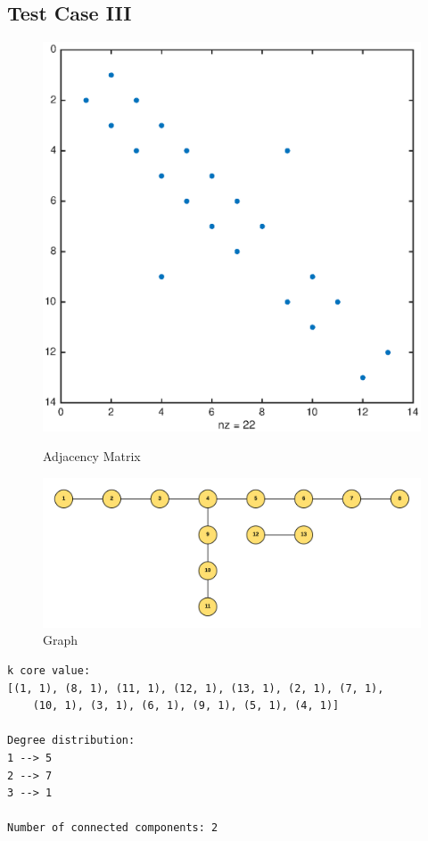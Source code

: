 \subsection{Test Case III}
\begin{figure}[H]
  \includegraphics[width=\linewidth]{spy3.eps}
  \caption{Adjacency Matrix}
\endminipage\hfill
{}
  \includegraphics[width=\linewidth]{graph3}
  \caption{Graph}
\endminipage
\end{figure}

\begin{verbatim}
k core value:
[(1, 1), (8, 1), (11, 1), (12, 1), (13, 1), (2, 1), (7, 1), 
	(10, 1), (3, 1), (6, 1), (9, 1), (5, 1), (4, 1)]

Degree distribution:
1 --> 5
2 --> 7
3 --> 1

Number of connected components: 2
\end{verbatim}

